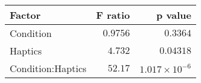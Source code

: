 \begin{tabular}{lrr}
\toprule
            Factor &  F ratio &               p value \\
\midrule
         Condition & $0.9756$ &              $0.3364$ \\
           Haptics &  $4.732$ &             $0.04318$ \\
 Condition:Haptics &  $52.17$ & $1.017\times 10^{-6}$ \\
\bottomrule
\end{tabular}
